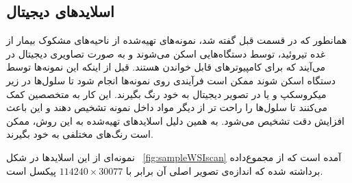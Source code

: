 \subsection{اسلاید‌های دیجیتال}\label{subsec:اسلاید-های-دیجیتال}
همانطور که در قسمت قبل گفته شد، نمونه‌های تهیه‌شده از ناحیه‌های مشکوک بیمار از غده تیروئید، توسط دستگاه‌هایی اسکن می‌شوند و به صورت تصاویری دیجیتال در می‌آیند که برای کامپیوتر‌های قابل خواندن هستند.
قبل از اینکه این نمونه‌ها توسط دستگاه اسکن شوند ممکن است فرآیندی روی نمونه‌ها انجام شود تا سلول‌ها در زیر میکروسکپ و یا در تصویر دیجیتال به خود رنگ بگیرند.
این کار به متخصصین کمک می‌کنند تا سلول‌ها را راحت تر از دیگر مواد داخل نمونه تشخیص دهند و این باعث افزایش دقت تشخیص می‌شود.
به همین دلیل اسلاید‌های تهیه‌شده به این روش، ممکن است رنگ‌های مختلفی به خود بگیرند.


نمونه‌ای از این اسلاید‌ها در شکل ~\autoref{fig:sampleWSIscan} آمده است که از مجموع‌داده \cite{ncigdc} برداشته شده که اندازه‌ی تصویر اصلی آن برابر با
 $114240\times30077$
 پیکسل است.

